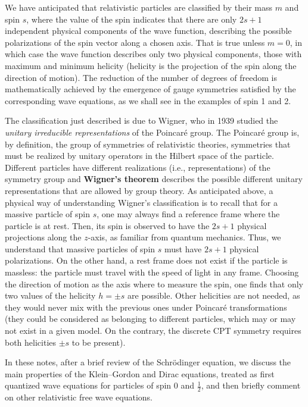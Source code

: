 We have anticipated that relativistic particles are classified by their mass \(m\) and spin \(s\), where the value of the spin indicates that there are only \(2s+1\) independent physical components of the wave function, describing the possible polarizations of the spin vector along a chosen axis. That is true unless \(m=0\), in which case the wave function describes only two physical components, those with maximum and minimum helicity (helicity is the projection of the spin along the direction of motion). The reduction of the number of degrees of freedom is mathematically achieved by the emergence of gauge symmetries satisfied by the corresponding wave equations, as we shall see in the examples of spin 1 and 2.

The classification just described is due to Wigner, who in 1939 studied the \textit{unitary irreducible representations} of the Poincar\'e group. The Poincar\'e group is, by definition, the group of symmetries of relativistic theories, symmetries that must be realized by unitary operators in the Hilbert space of the particle. Different particles have different realizations (i.e., representations) of the symmetry group and \textbf{Wigner's theorem} describes the possible different unitary representations that are allowed by group theory. As anticipated above, a physical way of understanding Wigner's classification is to recall that for a massive particle of spin \(s\), one may always find a reference frame where the particle is at rest. Then, its spin is observed to have the \(2s + 1\) physical projections along the \(z\)-axis, as familiar from quantum mechanics. Thus, we understand that massive particles of spin \(s\) must have \(2s+1\) physical polarizations. On the other hand, a rest frame does not exist if the particle is massless: the particle must travel with the speed of light in any frame. Choosing the direction of motion as the axis where to measure the spin, one finds that only two values of the helicity \(h = \pm s\) are possible. Other helicities are not needed, as they would never mix with the previous ones under Poincar\'e transformations (they could be considered as belonging to different particles, which may or may not exist in a given model. On the contrary, the discrete CPT symmetry requires both helicities \(\pm s\) to be present).

In these notes, after a brief review of the Schr\"odinger equation, we discuss the main properties of the Klein--Gordon and Dirac equations, treated as first quantized wave equations for particles of spin \(0\) and \(\tfrac{1}{2}\), and then briefly comment on other relativistic free wave equations.

